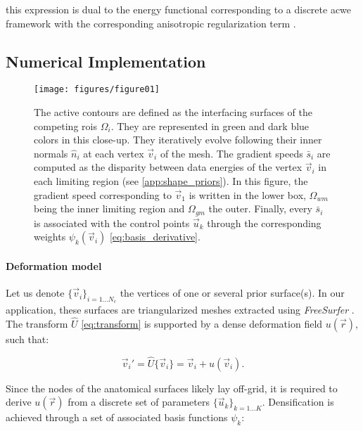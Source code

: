   this expression is dual to the energy functional corresponding
  to a discrete \gls*{acwe} framework \citep{chan_active_2001}
  with the corresponding anisotropic regularization term \citep{nagel_investigation_1986}.


\subsection{Numerical Implementation}
\label{sec:numerical_implementation}

\begin{figure}
	\texttt{[image: figures/figure01]}
	\caption{The active contours are defined as the interfacing surfaces of the competing
	  \glspl{roi} $\Omega_i$.
	They are represented in green and dark blue colors in this close-up.
	They iteratively evolve following their inner normals $\hat{n}_i$ at each vertex
	  $\vec{v}_i$ of the mesh.
	The gradient speeds $\bar{s}_i$ are computed as the disparity between data energies of
	  the vertex $\vec{v}_i$ in each limiting region (see \autoref{app:shape_priors}).
	In this figure, the gradient speed corresponding to $\vec{v}_1$ is written in the lower
	  box, $\Omega_{wm}$ being the inner limiting region and $\Omega_{gm}$ the outer.
	Finally, every $\bar{s}_i$ is associated with the control points $\vec{u}_k$ through
	  the corresponding weights $\psi_k(\vec{v}_i)$ \eqref{eq:basis_derivative}.
	}\label{fig:method}
\end{figure}

\paragraph*{Deformation model}\label{sec:deformation_model}
Let us denote $\{\vec{v}_i\}_{i=1 \ldots N_c}$ the vertices of one or several prior
  surface(s).
In our application, these surfaces are triangularized meshes extracted using \emph{FreeSurfer}
  \citep{fischl_freesurfer_2012}.
The transform $\hat{U}$ \eqref{eq:transform} is supported by a dense deformation field
  $u(\vec{r})$, such that:

  \begin{equation}
  \vec{v}_i' = \hat{U}\{\vec{v}_i\} = \vec{v}_i + u(\vec{v}_i).
  \label{eq:nodes_tfm}
  \end{equation}

Since the nodes of the anatomical surfaces likely lay off-grid, it is required to
  derive $u(\vec{r})$ from a discrete set of parameters $\{\vec{u}_k\}_{k=1 \ldots K}$.
Densification is achieved through a set of associated basis functions $\psi_k$:

